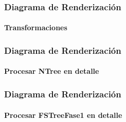 \documentclass[12pt]{beamer}
\begin{document}
\begin{frame}
\frametitle{Diagrama de Renderización}
\framesubtitle{Transformaciones}
\end{frame}

\begin{frame}
\frametitle{Diagrama de Renderización}
\framesubtitle{Procesar NTree en detalle}
\end{frame}

\begin{frame}
\frametitle{Diagrama de Renderización}
\framesubtitle{Procesar FSTreeFase1 en detalle}
\end{frame}
\end{document}
